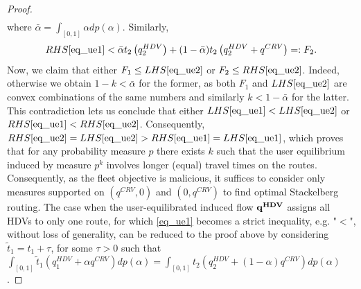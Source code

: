 \documentclass[a4paper,11pt]{article}
\begin{document}
\begin{proof}
\begin{eqnarray*}
\end{eqnarray*}
where $\bar{\alpha} = \int_{[0,1]} \alpha dp(\alpha)$. Similarly,
\begin{equation*}
RHS\eqref{eq_ue1} < \bar{\alpha}t_2\left(q_2^{HDV}\right) + (1-\bar{\alpha})t_2\left(q_2^{HDV} + q^{CRV}\right) =: F_2.
\end{equation*}
Now, we claim that either $F_1 \le LHS\eqref{eq_ue2}$ or  $F_2 \le RHS\eqref{eq_ue2}$. Indeed, otherwise we obtain $1-k < \bar{\alpha}$ for the former, as both $F_1$ and $LHS\eqref{eq_ue2}$ are convex combinations of the same numbers and similarly $k < 1-\bar{\alpha}$ for the latter. This contradiction lets us conclude that either $LHS\eqref{eq_ue1} < LHS\eqref{eq_ue2}$ or $RHS\eqref{eq_ue1} < RHS\eqref{eq_ue2}$. Consequently, $RHS\eqref{eq_ue2} = LHS\eqref{eq_ue2} > RHS\eqref{eq_ue1} = LHS\eqref{eq_ue1}$, which proves that for any probability measure $p$ there exists $k$ such that the user equilibrium induced by measure $p^k$ involves longer (equal) travel times on the routes. Consequently, as the fleet objective is malicious, it suffices to consider only measures supported on $(q^{CRV},0)$ and $(0,q^{CRV})$ to find optimal Stackelberg routing. The case when the user-equilibrated induced flow $\bold{q^{HDV}}$ assigns all HDVs to only one route, for which \eqref{eq_ue1} becomes a strict inequality, e.g. "$<$", without loss of generality, can be reduced to the proof above by considering $\tilde{t}_1 = t_1 + \tau$, for some $\tau>0$ such that $\int_{[0,1]} \tilde{t}_1\left(q_1^{HDV} + \alpha q^{CRV}\right) dp(\alpha) = \int_{[0,1]} t_2\left(q_2^{HDV} + (1-\alpha) q^{CRV}\right) dp(\alpha)$.  
\end{proof}
\end{document}
